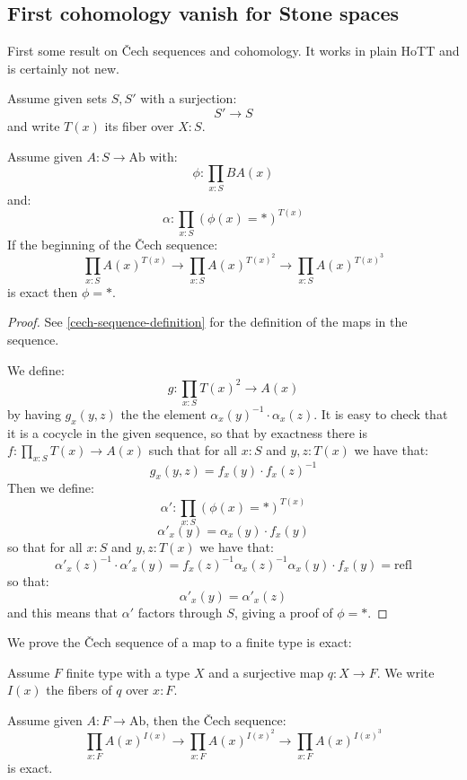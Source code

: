 \subsection{First cohomology vanish for Stone spaces}

First some result on \v{C}ech sequences and cohomology. It works in plain HoTT and is certainly not new.

\begin{lemma}\label{cocyle-being-coboundary}
Assume given sets $S,S'$ with a surjection:
\[S'\to S\]
and write $T(x)$ its fiber over $X:S$.

Assume given $A:S\to \mathrm{Ab}$ with:
\[\phi:\prod_{x:S}BA(x)\]
and:
\[\alpha:\prod_{x:S}(\phi(x)=*)^{T(x)}\]
If the beginning of the \v{C}ech sequence:
\[\prod_{x:S}A(x)^{T(x)} \to \prod_{x:S}A(x)^{T(x)^2}  \to \prod_{x:S}A(x)^{T(x)^3} \]
is exact then $\phi=*$.
\end{lemma}

\begin{proof}
See \cref{cech-sequence-definition} for the definition of the maps in the sequence.

We define:
\[g : \prod_{x:S}T(x)^2\to A(x)\]
by having $g_x(y,z)$ the the element $\alpha_x(y)^{-1}\cdot\alpha_x(z)$. It is easy to check that it is a cocycle in the given sequence, so that by exactness there is $f:\prod_{x:S}T(x)\to A(x)$ such that for all $x:S$ and $y,z:T(x)$ we have that:
\[g_x(y,z)=f_x(y)\cdot f_x(z)^{-1}\]
Then we define:
\[\alpha' : \prod_{x:S}(\phi(x)=*)^{T(x)}\]
\[\alpha'_x(y) = \alpha_x(y)\cdot f_x(y)\]
so that for all $x:S$ and $y,z:T(x)$ we have that:
\[\alpha'_x(z)^{-1}\cdot\alpha'_x(y) = f_x(z)^{-1}\alpha_x(z)^{-1}\alpha_x(y)\cdot f_x(y) = \mathrm{refl}\]
so that:
\[\alpha'_x(y)=\alpha'_x(z)\]
and this means that $\alpha'$ factors through $S$, giving a proof of $\phi=*$.
\end{proof}

We prove the \v{C}ech sequence of a map to a finite type is exact:

\begin{lemma}\label{vanishing-cech-finite-types}
Assume $F$ finite type with a type $X$ and a surjective map $q:X\to F$. We write $I(x)$ the fibers of $q$ over $x:F$. 

Assume given $A:F\to \mathrm{Ab}$, then the \v{C}ech sequence:
\[\prod_{x:F}A(x)^{I(x)} \to \prod_{x:F}A(x)^{I(x)^2}  \to \prod_{x:F}A(x)^{I(x)^3} \]
is exact.
\end{lemma}

